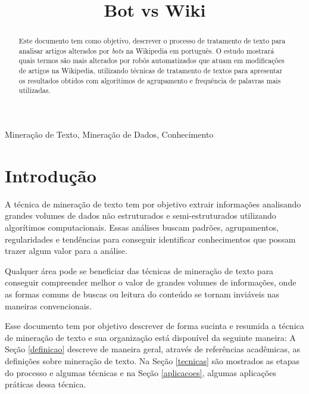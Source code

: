 \documentclass[conference]{IEEEtran}
\begin{document}
\title{Bot vs Wiki}

\author{
}

\maketitle

\begin{abstract}
Este documento tem como objetivo, descrever o processo de tratamento de texto para analisar artigos alterados por \textit{bots} na Wikipedia em português. O estudo mostrará quais termos são mais alterados por robôs automatizados que atuam em modificações de artigos na Wikipedia, utilizando técnicas de tratamento de textos para apresentar os resultados obtidos com algorítimos de agrupamento e frequência de palavras mais utilizadas.
\end{abstract}

\begin{IEEEkeywords}
Mineração de Texto, Mineração de Dados, Conhecimento
\end{IEEEkeywords}

\section{Introdução}
A técnica de mineração de texto tem por objetivo extrair informações  analisando grandes volumes de dados não estruturados e semi-estruturados utilizando algorítimos computacionais. Essas análises buscam padrões, agrupamentos, regularidades e tendências para conseguir identificar conhecimentos que possam trazer algum  valor para a análise.

Qualquer área pode se beneficiar das técnicas de mineração de texto para conseguir compreender melhor o valor de grandes volumes de informações, onde as formas comuns de buscas ou leitura do conteúdo se tornam inviáveis nas maneiras convencionais.

Esse documento tem por objetivo descrever de forma sucinta e resumida a técnica de mineração de texto e sua organização está disponível da seguinte maneira: A Seção \ref{definicao} descreve de maneira geral, através de referências acadêmicas, as definições sobre mineração de texto. Na Seção \ref{tecnicas} são mostrados as etapas do processo e algumas técnicas e na Seção \ref{aplicacoes}, algumas aplicações práticas dessa técnica.
\end{document}
